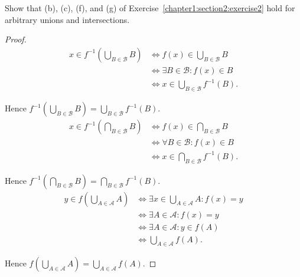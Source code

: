 \begin{exercise}\label{chapter1:section2:exercise3}
    Show that (b), (c), (f), and (g) of Exercise~\ref{chapter1:section2:exercise2} hold for arbitrary unions and intersections.
\end{exercise}

\begin{proof}
    \begin{align*}
        x \in f^{-1}\left(\bigcup_{B\in\mathscr{B}}B\right) & \Longleftrightarrow f(x) \in \bigcup_{B\in\mathscr{B}}B      \\
                                                            & \Longleftrightarrow \exists B\in\mathscr{B}: f(x)\in B       \\
                                                            & \Longleftrightarrow x\in \bigcup_{B\in\mathscr{B}}f^{-1}(B).
    \end{align*}

    Hence $f^{-1}\left(\bigcup_{B\in\mathscr{B}}B\right) = \bigcup_{B\in\mathscr{B}}f^{-1}(B)$.
    \begin{align*}
        x \in f^{-1}\left(\bigcap_{B\in\mathscr{B}}B\right) & \Longleftrightarrow f(x) \in \bigcap_{B\in\mathscr{B}}B      \\
                                                            & \Longleftrightarrow \forall B\in\mathscr{B}: f(x)\in B       \\
                                                            & \Longleftrightarrow x\in \bigcap_{B\in\mathscr{B}}f^{-1}(B).
    \end{align*}

    Hence $f^{-1}\left(\bigcap_{B\in\mathscr{B}}B\right) = \bigcap_{B\in\mathscr{B}}f^{-1}(B)$.
    \begin{align*}
        y\in f\left(\bigcup_{A\in\mathscr{A}}A\right) & \Longleftrightarrow \exists x\in \bigcup_{A\in\mathscr{A}}A : f(x) = y \\
                                                      & \Longleftrightarrow \exists A\in\mathscr{A}: f(x) = y                  \\
                                                      & \Longleftrightarrow \exists A\in\mathscr{A}: y\in f(A)                 \\
                                                      & \Longleftrightarrow \bigcup_{A\in\mathscr{A}}f(A).
    \end{align*}

    Hence $f\left(\bigcup_{A\in\mathscr{A}}A\right) = \bigcup_{A\in\mathscr{A}}f(A)$.


\end{proof}
